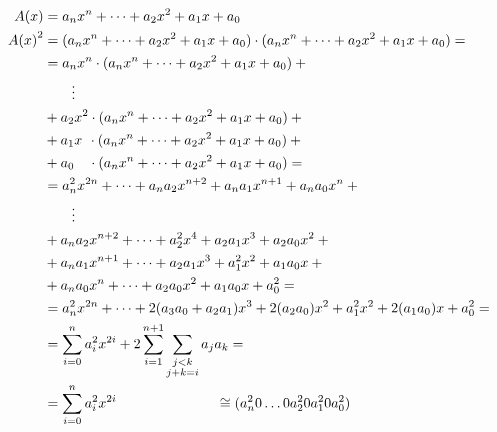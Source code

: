 \documentclass[thesis=M,czech,hidelinks]{FITthesis}[2012/06/26]
\newcommand{\0}{{\textcolor[gray]{0.80}{0}}}
\begin{document}
\begin{align*}
    A(x)     &=  a_n x^n + \dots + a_2 x^2 + a_1 x + a_0 \\
    {A(x)}^2 &=  (a_n x^n + \dots + a_2 x^2 + a_1 x + a_0)\cdot(a_n x^n + \dots + a_2 x^2 + a_1 x + a_0) =  \\
             &= a_n x^n   \cdot (a_n x^n + \dots + a_2 x^2 + a_1 x + a_0) + {}                              \\
             & \qquad \vdots                                                                                \\
             &  {} + a_2 x^2   \cdot (a_n x^n + \dots + a_2 x^2 + a_1 x + a_0) + {}                         \\
             &  {} + a_1 x \, \:  \cdot (a_n x^n + \dots + a_2 x^2 + a_1 x + a_0) + {}                      \\
             &  {} + a_0 \quad \cdot (a_n x^n + \dots + a_2 x^2 + a_1 x + a_0) =                            \\
             &= a_n^2 x^{2n}    + \dots + a_n a_2 x^{n+2} + a_n a_1 x^{n+1} + a_n a_0 x^n + {}              \\
             & \qquad \vdots                                                                                \\
             &  {} + a_n a_2 x^{n+2} + \dots + a_2^2 x^4       + a_2 a_1 x^3     + a_2 a_0 x^2 + {}         \\
             &  {} + a_n a_1 x^{n+1} + \dots + a_2 a_1 x^3     + a_1^2 x^2       + a_1 a_0 x   + {}         \\
             &  {} + a_n a_0 x^n     + \dots + a_2 a_0 x^2     + a_1 a_0 x       + a_0^2       =            \\
             &= a_n^2 x^{2n} + \dots  + 2 ( a_3 a_0 + a_2 a_1 ) x^3  + 2 ( a_2 a_0 ) x^2 + a_1^2 x^2 + 2 ( a_1 a_0 ) x + a_0^2 = \\
             &= \sum_{i=0}^{n} a_i^2 x^{2i} + 2 \sum_{i=1}^{n+1}\sum_{\substack{j<k \\ j+k = i}} a_j a_k =  \\
             &= \sum_{i=0}^{n} a_i^2 x^{2i}
    \hspace{2.5cm} \cong (a_n^2 0 \dots 0 a_2^2 0 a_1^2 0 a_0^2)
\end{align*}
\end{document}
